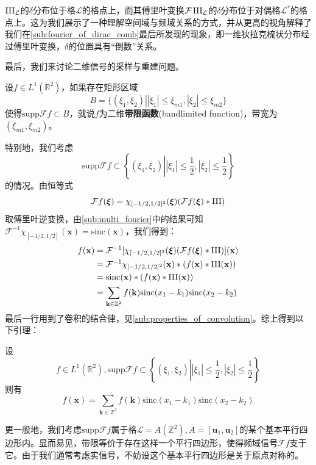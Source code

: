$\operatorname{III}_{\mathcal{L} }$的$\delta$分布位于格$\mathcal{L} $的格点上，而其傅里叶变换$\mathcal{F} \operatorname{III}_{\mathcal{L} }$的$\delta$分布位于对偶格$\mathcal{L} ^*$的格点上。这为我们展示了一种理解空间域与频域关系的方式，并从更高的视角解释了我们在\ref{sub:fourier_of_dirac_comb}最后所发现的现象，即一维狄拉克梳状分布经过傅里叶变换，$\delta$的位置具有“倒数”关系。

最后，我们来讨论二维信号的采样与重建问题。
\begin{definition}[二维带限函数]
    设$f\in L^1(\mathbb{R}^2)$，如果存在矩形区域$$B=\{( \xi_1,\xi_2)\left| |\xi_1|\leq \xi_{m1},|\xi_2|\leq \xi_{m2}\right.\}$$
    使得$\text{supp} \mathcal{F}f \subset B$，就说$f$为二维\textbf{带限函数}(bandlimited function)，带宽为$(\xi_{m1},\xi_{m2})$。
\end{definition}
特别地，我们考虑
$$\text{supp}\mathcal{F} f\subset\left\{( \xi_1,\xi_2)\left| |\xi_1|\leq \dfrac{1}{2},|\xi_2|\leq \dfrac{1}{2}\right.\right\}$$
的情况。由恒等式
\[\mathcal{F} f(\boldsymbol{\xi})=\chi_{[-1/2,1/2]^2}(\boldsymbol{\xi})(\mathcal{F} f(\boldsymbol{\xi})*\operatorname{III})\]
取傅里叶逆变换，由\ref{sub:multi_fourier}中的结果可知$\mathcal{F} ^{-1}\chi_{[-1/2,1/2]}(\mathbf{x})=\text{sinc}(\mathbf{x})$，我们得到：\begin{align*}
    f(\mathbf{x})&=\mathcal{F} ^{-1}[\chi_{[-1/2,1/2]^2}(\boldsymbol{\xi})(\mathcal{F} f(\boldsymbol{\xi})*\operatorname{III})](\mathbf{x})\\
    &=\mathcal{F} ^{-1}\chi_{[-1/2,1/2]^2}(\mathbf{x})*(f(\mathbf{x})*\operatorname{III}(\mathbf{x}))\\
    &=\text{sinc}(\mathbf{x})*(f(\mathbf{x})*\operatorname{III}(\mathbf{x}))\\
    &=\sum_{\mathbf{k}\in\mathbb{Z}^2}f(\mathbf{k})\text{sinc}(x_1-k_1)\text{sinc}(x_2-k_2)
\end{align*}
最后一行用到了卷积的结合律，见\ref{sub:properties_of_convolution}。综上得到以下引理：
\begin{lemma}[方形采样公式]
    设$$f\in L^1(\mathbb{R}^2),\text{supp}\mathcal{F} f\subset\left\{( \xi_1,\xi_2)\left| |\xi_1|\leq \dfrac{1}{2},|\xi_2|\leq \dfrac{1}{2}\right.\right\}$$
    则有
    \[f(\mathbf{x})=\sum_{\mathbf{k}\in\mathbb{Z}^2}f(\mathbf{k})\text{sinc}(x_1-k_1)\text{sinc}(x_2-k_2)\]
\end{lemma}

更一般地，我们考虑$\text{supp}\mathcal{F} f$属于格$\mathcal{L} =A(\mathbb{Z}^2),A=[\mathbf{u}_1,\mathbf{u}_2]$的某个基本平行四边形内。显而易见，带限等价于存在这样一个平行四边形，使得频域信号$\mathcal{F} f$支于它。由于我们通常考虑实信号，不妨设这个基本平行四边形是关于原点对称的。


